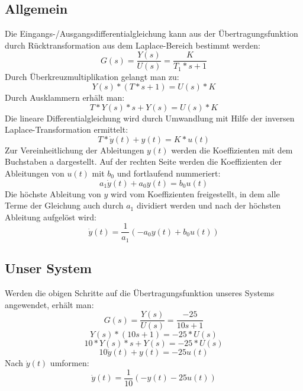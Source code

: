 \subsection{Allgemein}
Die Eingangs-/Ausgangsdifferentialgleichung kann aus der Übertragungsfunktion durch Rücktransformation aus dem Laplace-Bereich bestimmt werden:
\begin{equation*}
  G(s) = \frac{Y(s)}{U(s)} = \frac{K}{T_1*s+1}
\end{equation*}
Durch Überkreuzmultiplikation gelangt man zu:
\begin{equation*}
  Y(s)*(T*s+1) = U(s)*K
\end{equation*}
Durch Ausklammern erhält man:
\begin{equation*}
  T*Y(s)*s + Y(s) = U(s)*K
\end{equation*}
Die lineare Differentialgleichung wird durch Umwandlung mit Hilfe der inversen Laplace-Transformation ermittelt:
\begin{equation*}
  T* \dot y(t) + y(t) = K * u(t)
\end{equation*}
Zur Vereinheitlichung der Ableitungen $y(t)$ werden die Koeffizienten mit dem Buchstaben a dargestellt.
Auf der rechten Seite werden die Koeffizienten der Ableitungen von $u(t)$ mit $b_0$ und fortlaufend nummeriert:
\begin{equation*}
  a_1\dot y(t)+a_0y(t) = b_0u(t)
\end{equation*}
Die höchste Ableitung von $y$ wird vom Koeffizienten freigestellt, in dem alle Terme der Gleichung auch durch $a_1$ dividiert werden und nach der höchsten Ableitung aufgelöst wird:
\begin{equation*}
  \dot y(t)= \frac{1}{a_1}(-a_0y(t) +b_0u(t))
\end{equation*}

\subsection{Unser System}
Werden die obigen Schritte auf die Übertragungsfunktion unseres Systems angewendet, erhält man:
\begin{equation*}
  G(s)=\frac{Y(s)}{U(s)}=\frac{-25}{10s+1}
\end{equation*}
\begin{equation*}
  Y(s)*(10s+1) = -25*U(s)
\end{equation*}
\begin{equation*}
  10*Y(s)*s + Y(s) = -25*U(s)
\end{equation*}
\begin{equation*}
  10 \dot y(t) + y(t) = -25u(t)
\end{equation*}
Nach $\dot y(t)$ umformen:
\begin{equation*}
  \dot y(t)= \frac{1}{10}(-y(t)-25u(t))
\end{equation*}